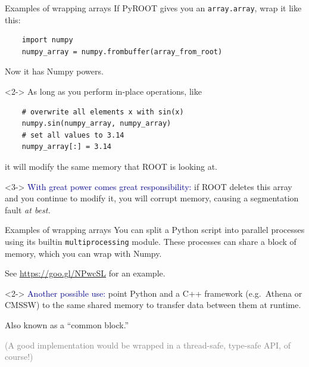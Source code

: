\documentclass{beamer}
\begin{document}
\begin{frame}[fragile]{Examples of wrapping arrays}
\vspace{0.25 cm}
If PyROOT gives you an {\tt array.array}, wrap it like this:

\small
\begin{verbatim}
    import numpy
    numpy_array = numpy.frombuffer(array_from_root)
\end{verbatim}

\normalsize
Now it has Numpy powers.

\begin{uncoverenv}<2->
\vspace{0.25 cm}
As long as you perform in-place operations, like

\small
\begin{verbatim}
    # overwrite all elements x with sin(x)
    numpy.sin(numpy_array, numpy_array)
    # set all values to 3.14
    numpy_array[:] = 3.14
\end{verbatim}

\normalsize
it will modify the same memory that ROOT is looking at.
\end{uncoverenv}

\begin{uncoverenv}<3->
\vspace{0.25 cm}
\textcolor{darkblue}{With great power comes great responsibility:} if ROOT deletes this array and you continue to modify it, you will corrupt memory, causing a segmentation fault {\it at best.}
\end{uncoverenv}
\end{frame}

\begin{frame}[fragile]{Examples of wrapping arrays}
\vspace{0.25 cm}
You can split a Python script into parallel processes using its builtin {\tt multiprocessing} module. These processes can share a block of memory, which you can wrap with Numpy.

\vspace{0.25 cm}
See \textcolor{blue}{\underline{\url{https://goo.gl/NPwcSL}}} for an example.

\vfill
\begin{uncoverenv}<2->
\textcolor{darkblue}{Another possible use:} point Python and a C++ framework (e.g.\ Athena or CMSSW) to the same shared memory to transfer data between them at runtime.

\vspace{0.25 cm}
Also known as a ``common block.'' \hspace{0.25 cm}{\tt :)}

\vspace{0.25 cm}
\textcolor{gray}{(A good implementation would be wrapped in a thread-safe, type-safe API, of course!)}
\end{uncoverenv}
\end{frame}
\end{document}
